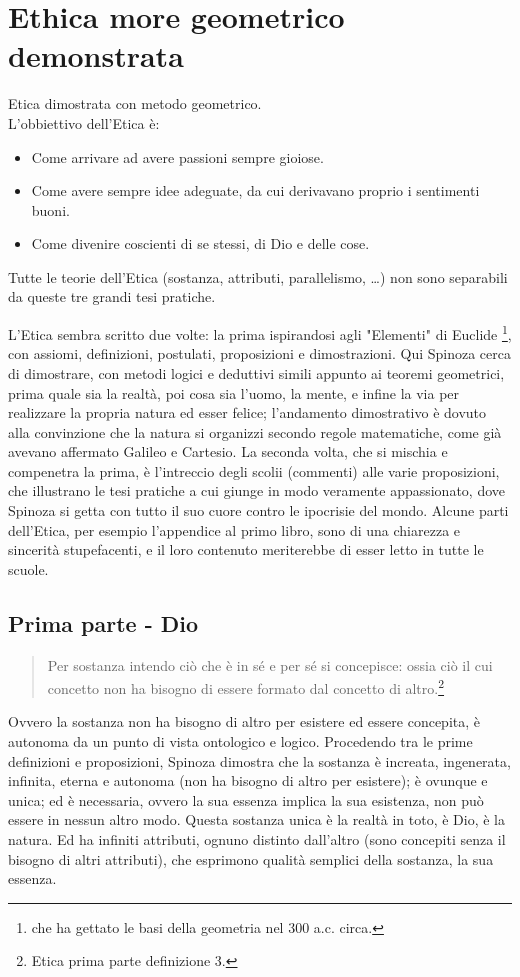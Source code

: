 \chapter{Ethica more geometrico demonstrata}
Etica dimostrata con metodo geometrico.\\L'obbiettivo dell'Etica è:\begin{itemize}
	\item Come arrivare ad avere passioni sempre gioiose.
	\item Come avere sempre idee adeguate, da cui derivavano proprio i sentimenti buoni.
	\item Come divenire coscienti di se stessi, di Dio e delle cose.
\end{itemize}

Tutte le teorie dell'Etica (sostanza, attributi, parallelismo, \dots) non sono separabili da queste tre grandi tesi pratiche.

L'Etica sembra scritto due volte: la prima ispirandosi agli "Elementi" di Euclide \footnote{che ha gettato le basi della geometria nel 300 a.c. circa.}, con assiomi, definizioni, postulati, proposizioni e dimostrazioni. Qui Spinoza cerca di dimostrare, con metodi logici e deduttivi simili appunto ai teoremi geometrici, prima quale sia la realtà, poi cosa sia l'uomo, la mente, e infine la via per realizzare la propria natura ed esser felice; l'andamento dimostrativo è dovuto alla convinzione che la natura si organizzi secondo regole matematiche, come già avevano affermato Galileo e Cartesio. La seconda volta, che si mischia e compenetra la prima, è l'intreccio degli scolii (commenti) alle varie proposizioni, che illustrano le tesi pratiche a cui giunge in modo veramente appassionato, dove Spinoza si getta con tutto il suo cuore contro le ipocrisie del mondo. Alcune parti dell'Etica, per esempio l'appendice al primo libro, sono di una chiarezza e sincerità stupefacenti, e il loro contenuto meriterebbe di esser letto in tutte le scuole.
\newpage

\section{Prima parte - Dio}
\begin{quotation}
\small	Per sostanza intendo ciò che è in sé e per sé si concepisce: ossia ciò il cui concetto non ha bisogno di essere formato dal concetto di altro.\footnote{Etica prima parte definizione 3.}
\end{quotation}

Ovvero la sostanza non ha bisogno di altro per esistere ed essere concepita, è autonoma da un punto di vista ontologico e logico. Procedendo tra le prime definizioni e proposizioni, Spinoza dimostra che la sostanza è increata, ingenerata, infinita, eterna e autonoma (non ha bisogno di altro per esistere); è ovunque e unica; ed è necessaria, ovvero la sua essenza implica la sua esistenza, non può essere in nessun altro modo.
Questa sostanza unica è la realtà in toto, è Dio, è la natura. 
Ed ha infiniti attributi, ognuno distinto dall'altro (sono concepiti senza il bisogno di altri attributi), che esprimono qualità semplici della sostanza, la sua essenza.

